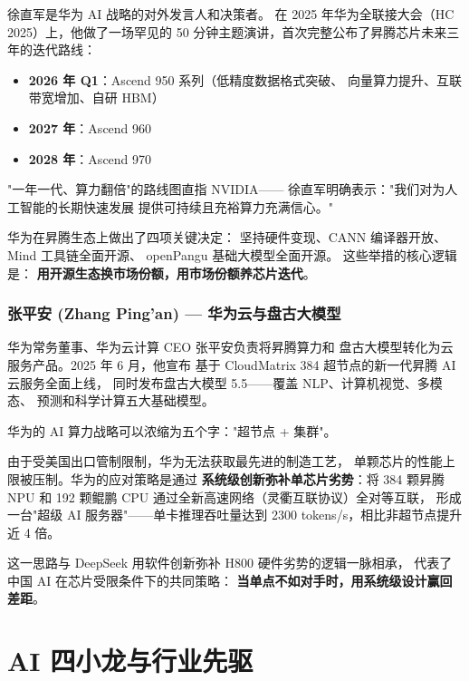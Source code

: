 徐直军是华为 AI 战略的对外发言人和决策者。
在 2025 年华为全联接大会（HC 2025）上，他做了一场罕见的
50 分钟主题演讲，首次完整公布了昇腾芯片未来三年的迭代路线：
\begin{itemize}[noitemsep]
  \item \textbf{2026 年 Q1}：Ascend 950 系列（低精度数据格式突破、
        向量算力提升、互联带宽增加、自研 HBM）
  \item \textbf{2027 年}：Ascend 960
  \item \textbf{2028 年}：Ascend 970
\end{itemize}
"一年一代、算力翻倍"的路线图直指 NVIDIA——
徐直军明确表示："我们对为人工智能的长期快速发展
提供可持续且充裕算力充满信心。"

华为在昇腾生态上做出了四项关键决定：
坚持硬件变现、CANN 编译器开放、Mind 工具链全面开源、
openPangu 基础大模型全面开源。
这些举措的核心逻辑是：
\textbf{用开源生态换市场份额，用市场份额养芯片迭代}。

\subsubsection{张平安 (Zhang Ping'an) — 华为云与盘古大模型}

华为常务董事、华为云计算 CEO 张平安负责将昇腾算力和
盘古大模型转化为云服务产品。2025 年 6 月，他宣布
基于 CloudMatrix 384 超节点的新一代昇腾 AI 云服务全面上线，
同时发布盘古大模型 5.5——覆盖 NLP、计算机视觉、多模态、
预测和科学计算五大基础模型。

\begin{corebox}
华为的 AI 算力战略可以浓缩为五个字："超节点 + 集群"。

由于受美国出口管制限制，华为无法获取最先进的制造工艺，
单颗芯片的性能上限被压制。华为的应对策略是通过
\textbf{系统级创新弥补单芯片劣势}：将 384 颗昇腾 NPU 和
192 颗鲲鹏 CPU 通过全新高速网络（灵衢互联协议）全对等互联，
形成一台"超级 AI 服务器"——单卡推理吞吐量达到
2300 tokens/s，相比非超节点提升近 4 倍。

这一思路与 DeepSeek 用软件创新弥补 H800 硬件劣势的逻辑一脉相承，
代表了中国 AI 在芯片受限条件下的共同策略：
\textbf{当单点不如对手时，用系统级设计赢回差距}。
\end{corebox}



\section{AI 四小龙与行业先驱}
\label{sec:four-dragons}

